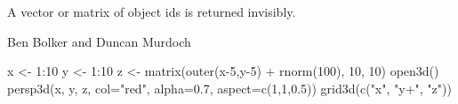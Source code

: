 \begin{Value}
A vector or matrix of object ids is returned invisibly.
\end{Value}
\begin{Author}\relax
Ben Bolker and Duncan Murdoch
\end{Author}
\begin{SeeAlso}\relax
{}
\end{SeeAlso}
\begin{Examples}
\begin{ExampleCode}
x <- 1:10
y <- 1:10
z <- matrix(outer(x-5,y-5) + rnorm(100), 10, 10)
open3d()
persp3d(x, y, z, col="red", alpha=0.7, aspect=c(1,1,0.5))
grid3d(c("x", "y+", "z"))
\end{ExampleCode}
\end{Examples}

